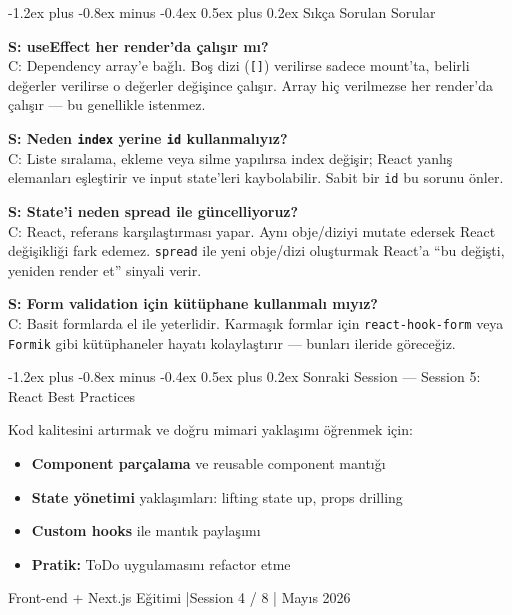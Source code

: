 \documentclass[12pt, a4paper]{article}
\makeatletter
\renewcommand{\subsection}{%
  \@startsection{subsection}{2}{\z@}%
    {-1.2ex plus -0.8ex minus -0.4ex}%
    {0.5ex plus 0.2ex}%
    {\normalfont\large\bfseries\sffamily\color{secondary}}%
}
\makeatother
\begin{document}
\vspace{6pt}

\subsection{Sıkça Sorulan Sorular}

\begin{warningbox}
\textbf{S: useEffect her render'da çalışır mı?}\\
C: Dependency array'e bağlı. Boş dizi (\texttt{[]}) verilirse sadece mount'ta,
belirli değerler verilirse o değerler değişince çalışır.
Array hiç verilmezse her render'da çalışır --- bu genellikle istenmez.

\vspace{6pt}
\textbf{S: Neden \texttt{index} yerine \texttt{id} kullanmalıyız?}\\
C: Liste sıralama, ekleme veya silme yapılırsa index değişir; React yanlış
elemanları eşleştirir ve input state'leri kaybolabilir. Sabit bir
\texttt{id} bu sorunu önler.

\vspace{6pt}
\textbf{S: State'i neden spread ile güncelliyoruz?}\\
C: React, referans karşılaştırması yapar. Aynı obje/diziyi mutate edersek
React değişikliği fark edemez. \texttt{spread} ile yeni obje/dizi oluşturmak
React'a ``bu değişti, yeniden render et'' sinyali verir.

\vspace{6pt}
\textbf{S: Form validation için kütüphane kullanmalı mıyız?}\\
C: Basit formlarda el ile yeterlidir. Karmaşık formlar için
\texttt{react-hook-form} veya \texttt{Formik} gibi kütüphaneler
hayatı kolaylaştırır --- bunları ileride göreceğiz.
\end{warningbox}

\vspace{6pt}

\subsection{Sonraki Session --- Session 5: React Best Practices}

\begin{infobox}
Kod kalitesini artırmak ve doğru mimari yaklaşımı öğrenmek için:
\begin{itemize}
  \item \textbf{Component parçalama} ve reusable component mantığı
  \item \textbf{State yönetimi} yaklaşımları: lifting state up, props drilling
  \item \textbf{Custom hooks} ile mantık paylaşımı
  \item \textbf{Pratik:} ToDo uygulamasını refactor etme
\end{itemize}
\end{infobox}

\vspace{16pt}
\begin{center}
  \color{gray}\sffamily\small
  Front-end + Next.js Eğitimi \quad|\quad Session 4 / 8 \quad| Mayıs 2026
\end{center}
\end{document}
